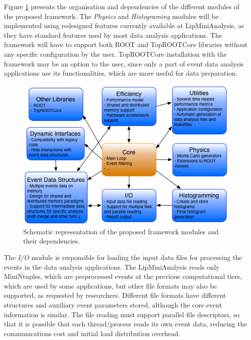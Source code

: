 Figure \ref{fig:new_framework} presents the organisation and dependencies of the different modules of the proposed framework. The \textit{Physics} and \textit{Histograming} modules will be implemented using redesigned features currently available at LipMiniAnalysis, as they have standard features used by most data analysis applications. The framework will have to support both ROOT and TopROOTCore libraries without any specific configuration by the user. TopROOTCore installation with the framework may be an option to the user, since only a part of event data analysis applications use its functionalities, which are more useful for data preparation.

\begin{figure}[!htp]
	\begin{center}
		\includegraphics[scale=0.7]{imgs/new_framework.png}
		\caption{Schematic representation of the proposed framework modules and their dependencies.}
		\label{fig:new_framework}
	\end{center}
\end{figure}

The \textit{I/O} module is responsible for loading the input data files for processing the events in the data analysis applications. The LipMiniAnalysis reads only MiniNtuples, which are preprocessed events at the previous computational tiers, which are used by some applications, but other file formats may also be supported, as requested by researchers. Different file formats have different structures and auxiliary event parameters stored, although the core event information is similar. The file reading must support parallel file descriptors, so that it is possible that each thread/process reads its own event data, reducing the communications cost and initial load distribution overhead.

